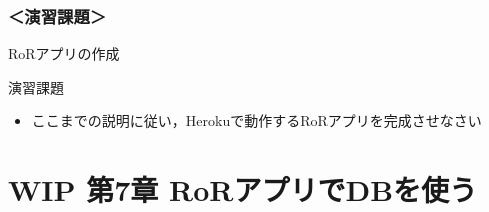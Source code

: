 \documentclass[t, aspectratio=169]{beamer}
\begin{document}
\section{＜演習課題＞}
\label{sec-6-4}
\begin{frame}[label=sec-6-4-1]{RoRアプリの作成}
\begin{block}{演習課題}
\begin{itemize}
\item ここまでの説明に従い，Herokuで動作するRoRアプリを完成させなさい
\end{itemize}
\end{block}
\end{frame}
\part{{\bfseries\sffamily WIP} 第7章 RoRアプリでDBを使う}
\label{sec-7}
\end{document}

